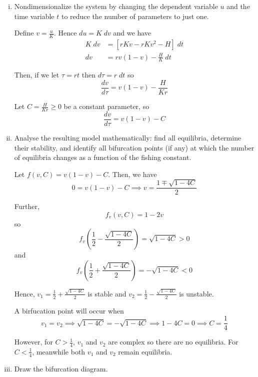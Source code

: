 \documentclass[12pt]{article}
\begin{document}
\begin{enumerate}[(i)]
    \item Nondimensionalize the system by changing the dependent variable $u$ and the time variable $t$ to reduce the
          number of parameters to just one.

          \color{blue}
          Define $v = \frac{u}{K}$. Hence $du = K\; dv$ and we have
          \begin{align*}
              K\; dv & = [rKv - rKv^2 - H]\; dt      \\
              dv     & = rv(1- v) - \frac{H}{K}\; dt
          \end{align*}

          Then, if we let $\tau = rt$ then $d\tau = r\; dt$ so
          \[\frac{dv}{d\tau} = v(1 - v) - \frac{H}{Kr}\]

          Let $C = \frac{H}{Kr} \geq 0$ be a constant parameter, so
          \[\frac{dv}{d\tau} = v(1 - v) - C\]
          \color{black}

    \item Analyse the resulting model mathematically: find all equilibria, determine their stability, and identify all
          bifurcation points (if any) at which the number of equilibria changes as a function of the fishing constant.

          \color{blue}
          Let $f(v, C) = v(1 - v) - C$. Then, we have
          \[0 = v(1 - v) - C \implies v = \frac{1 \mp \sqrt{1 - 4C}}{2}\]

          Further,
          \[f_v(v, C) = 1 - 2v\]
          so
          \[f_v\left(\frac{1}{2} - \frac{\sqrt{1 - 4C}}{2}\right) = \sqrt{1 - 4C} > 0\]
          and
          \[f_v\left(\frac{1}{2} + \frac{\sqrt{1 - 4C}}{2}\right) = -\sqrt{1 - 4C} < 0\]

          Hence, $v_1 = \frac{1}{2} + \frac{\sqrt{1 - 4C}}{2}$ is stable and $v_2 = \frac{1}{2} - \frac{\sqrt{1 - 4C}}{2}$ is unstable.

          A birfucation point will occur when
          \[v_1 = v_2 \implies \sqrt{1 - 4C} = -\sqrt{1 - 4C} \implies 1 - 4C = 0 \implies C = \frac{1}{4}\]

          However, for $C > \frac{1}{4}$, $v_1$ and $v_2$ are complex so there are no equilibria. For $C < \frac{1}{4}$, meanwhile both $v_1$ and $v_2$ remain equilibria.
          \color{black}

    \item Draw the bifurcation diagram.


\end{enumerate}
\end{document}
